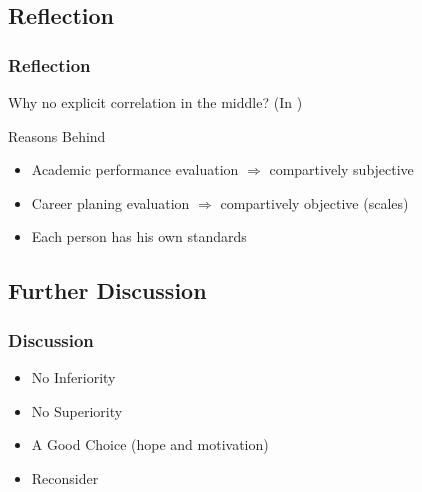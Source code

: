 \subsection{Reflection}
\begin{frame}
    \frametitle{Reflection}
    \Large
    Why no explicit correlation in the middle? (In )
    \begin{block}{Reasons Behind}
        \begin{itemize}[<+->]
            \item Academic performance evaluation $\Rightarrow$ compartively subjective
            \item Career planing evaluation $\Rightarrow$ compartively objective (scales)
            \item Each person has his own standards
        \end{itemize}
    \end{block}
\end{frame}

\subsection{Further Discussion}
\begin{frame}
    \frametitle{Discussion}
    \LARGE
    \begin{itemize}[<+->]
        \item No Inferiority
        \item No Superiority
        \item A Good Choice (hope and motivation) 
        \item Reconsider
    \end{itemize}
\end{frame}